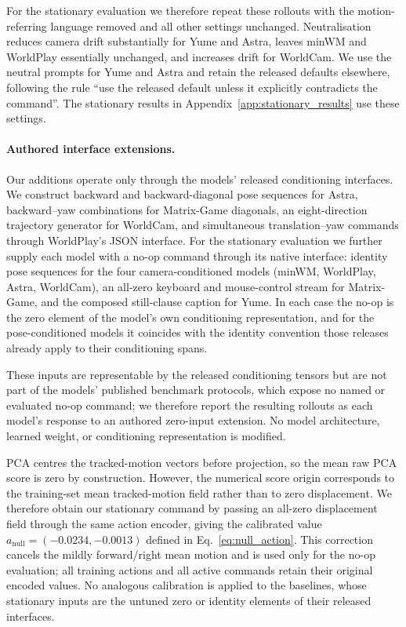 For the stationary evaluation we therefore repeat these rollouts with the
motion-referring language removed and all other settings unchanged.
Neutralisation reduces camera drift substantially for Yume and Astra, leaves
minWM and WorldPlay essentially unchanged, and increases drift for WorldCam.
We use the neutral prompts for Yume and Astra and retain the released defaults
elsewhere, following the rule ``use the released default unless it explicitly
contradicts the command''. The stationary results in
Appendix~\ref{app:stationary_results} use these settings.

\paragraph{Authored interface extensions.}
Our additions operate only through the models' released conditioning
interfaces. We construct backward and backward-diagonal pose sequences for
Astra, backward--yaw combinations for Matrix-Game diagonals, an
eight-direction trajectory generator for WorldCam, and simultaneous
translation--yaw commands through WorldPlay's JSON interface. For the
stationary evaluation we further supply each model with a no-op command
through its native interface: identity pose sequences for the four
camera-conditioned models (minWM, WorldPlay, Astra, WorldCam), an all-zero
keyboard and mouse-control stream for Matrix-Game, and the composed
still-clause caption for Yume. In each case the no-op is the zero element of
the model's own conditioning representation, and for the pose-conditioned
models it coincides with the identity convention those releases already apply
to their conditioning spans.

These inputs are representable by the released conditioning tensors but are
not part of the models' published benchmark protocols, which expose no named
or evaluated no-op command; we therefore report the resulting rollouts as each
model's response to an authored zero-input extension. No model architecture,
learned weight, or conditioning representation is modified.

PCA centres the tracked-motion vectors before projection, so the mean raw PCA
score is zero by construction. However, the numerical score origin corresponds
to the training-set mean tracked-motion field rather than to zero displacement.
We therefore obtain our stationary command by passing an all-zero displacement
field through the same action encoder, giving the calibrated value
$a_{\mathrm{null}}=(-0.0234,-0.0013)$ defined in
Eq.~\eqref{eq:null_action}. This correction cancels the mildly forward/right
mean motion and is used only for the no-op evaluation; all training actions and
all active commands retain their original encoded values. No analogous
calibration is applied to the baselines, whose stationary inputs are the
untuned zero or identity elements of their released interfaces.

